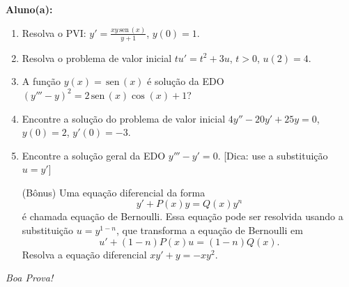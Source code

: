 \documentclass[a4paper,5pt]{amsbook}
\newcommand{\sen}{\,\mbox{sen}\,}
\newcommand{\ds}{\displaystyle}
\begin{document}
\vspace{0.5cm}
{\bf Aluno(a):}\dotfill{}  %

\vspace{0.2cm}
\begin{enumerate}
	\vspace{0.5cm}
	\item Resolva o PVI\@: $\ds y' = \frac{xy\sen(x)}{y+1}$, $y(0)=1$.

	\vspace{0.5cm}
	\item Resolva o problema de valor inicial $\ds t u' = t^2 + 3u$, $t>0$, $u(2)=4$.

	\vspace{0.5cm}
	\item A fun\c{c}\~ao $y(x) = \sen(x)$ \'e solu\c{c}\~ao da EDO ${(y''' - y)}^2 = 2\sen(x)\cos(x) + 1$?

	\vspace{0.5cm}
	\item Encontre a solu\c{c}\~ao do problema de valor inicial $4y'' - 20y' + 25y = 0$, $y(0) = 2$, $y'(0) = -3$.

	\vspace{0.5cm}
	\item Encontre a solu\c{c}\~ao geral da EDO $y''' - y' = 0$. [Dica: use a substitui\c{c}\~ao $u = y'$]

	\vspace{0.5cm}
	\item[(B\^onus)] Uma equa\c{c}\~ao diferencial da forma
		\[y' + P(x) y = Q(x) y^n\]
		\'e chamada equa\c{c}\~ao de Bernoulli. Essa equa\c{c}\~ao pode ser resolvida usando a
		substitui\c{c}\~ao $u = y^{1-n}$, que transforma a equa\c{c}\~ao de Bernoulli em
		\[u'+(1-n)P(x)u=(1-n)Q(x).\]
	   	Resolva a equa\c{c}\~ao diferencial $xy' + y = -xy^2$.
\end{enumerate}

\begin{flushright}
	\textit{Boa Prova!}
\end{flushright}
\end{document}
